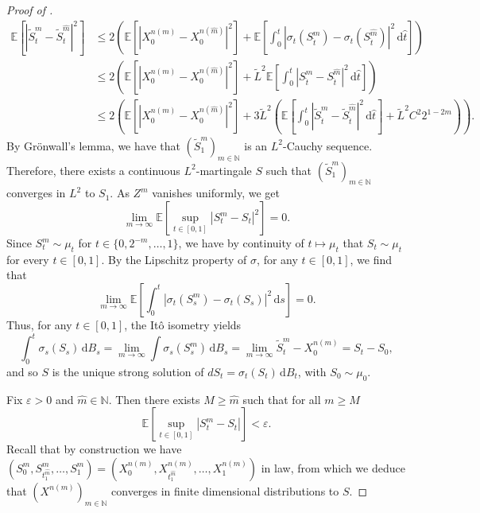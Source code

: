 \documentclass[12pt,oneside]{amsart}
\theoremstyle{definition}
\newcommand{\D}{\mathrm{d}}
\newcommand{\N}{\mathbb N}
\numberwithin{equation}{section}
\begin{document}
\begin{proof}[Proof of ]
\begin{align}
    \mathbb E \!\left[ |\tilde S^{m}_t - \tilde S^{\hat m}_t|^2 \right]\!
    &\le
    2
    \!\left( 
        \mathbb E\!\left[ |X^{n(m)}_0 - X^{n(\hat m)}_0|^2 \right]\! +
        \mathbb E\!\left[ \int_0^t |\sigma_t(S^{m}_{\hat t}) - \sigma_t(S^{\hat m}_{\hat t})|^2 \, \D \hat t\right]\!
    \right)\!
    \\
    &\le
    2
    \!\left( 
        \mathbb E\!\left[ |X^{n(m)}_0 - X^{n(\hat m)}_0|^2 \right]\! + \tilde L^2
        \mathbb E\!\left[ \int_0^t |S^{m}_{\hat t} - S^{\hat m}_{\hat t}|^2 \, \D \hat t\right]\!
    \right)\!
    \\
    &\le
    2
    \!\left( 
        \mathbb E\!\left[ |X^{n(m)}_0 - X^{n(\hat m)}_0|^2 \right]\! +
        3 \tilde L^2 
        \!\left(
            \mathbb E \!\left[ \int_0^t |\tilde S^{m}_{\hat t} - \tilde S^{\hat m}_{\hat t}|^2 \, \D \hat t\right]\!
            + \tilde L^2 C^2 2^{1 - 2m}
        \right)\!
    \right)\!.
\end{align}
By Gr\"onwall's lemma, we have that $(\tilde S^{m}_1)_{m \in \N}$ is an $L^2$-Cauchy sequence.
Therefore, there exists a continuous $L^2$-martingale $S$ such that $(\tilde S^{m}_1)_{m \in \N}$ converges in $L^2$ to $S_1$.
As $Z^m$ vanishes uniformly, we get
\begin{equation}
    \lim_{m \to \infty} \mathbb E \!\left[ \sup_{t \in [0,1]} |S^m_t - S_t|^2 \right]\! = 0.
\end{equation}
Since $S^m_t \sim \mu_t$ for $t \in \{0,2^{-m},\ldots,1\}$, we have by continuity of $t \mapsto \mu_t$ that $S_t \sim \mu_t$ for every $t \in [0,1]$.
By the Lipschitz property of $\sigma$, for any $t \in [0, 1]$, we find that
\begin{equation}
    \lim_{m \to \infty} \mathbb E \!\left[ \int_0^t |\sigma_t(S^m_s) - \sigma_t(S_s)|^2 \, \D s \right]\! = 0.
\end{equation}
Thus, for any $t \in [0, 1]$, the It\^o isometry yields
\begin{equation}
    \int_0^t \sigma_s(S_s) \, \D B_s = \lim_{m \to \infty} \int \sigma_s(S^m_s) \, \D B_s = \lim_{m \to \infty} \tilde S^m_t - X^{n(m)}_0 = S_t - S_0, 
\end{equation}
and so $S$ is the unique strong solution of $dS_t = \sigma_t(S_t) \, \D B_t$, with $S_0 \sim \mu_0$.

Fix $\varepsilon > 0$ and $\hat m \in \N$.
Then there exists $M \ge \hat m$ such that for all $m \ge M$
\begin{equation}
    \mathbb E \!\left[ \sup_{t \in [0,1]} |S^m_t - S_t| \right]\! < \varepsilon.
\end{equation}
Recall that by construction we have $(S^m_0, S^m_{t^{\hat m}_1},\ldots, S^m_1) = (X^{n(m)}_0, X^{n(m)}_{t^{\hat m}_1}, \ldots, X^{n(m)}_1)$ in law, from which we deduce that $(X^{n(m)})_{m \in \N}$ converges in finite dimensional distributions to $S$.


\end{proof}
\end{document}
